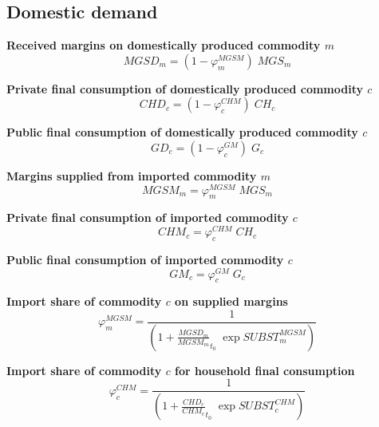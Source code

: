 \documentclass[12pt]{article}
\numberwithin{equation}{section}
\begin{document}
\subsection{Domestic demand}



\noindent \textbf{Received margins on domestically produced commodity $m$} 
\begin{dmath}
MGSD_{m} = \left( 1 - \varphi^{MGSM}_{m} \right) \; MGS_{m}
\label{Trade_inter.mdlMGSD[m]}
\end{dmath}

\noindent \textbf{Private final consumption of domestically produced commodity $c$} 
\begin{dmath}
CHD_{c} = \left( 1 - \varphi^{CHM}_{c} \right) \; CH_{c}
\label{Trade_inter.mdlCHD[c]}
\end{dmath}

\noindent \textbf{Public final consumption of domestically produced commodity $c$} 
\begin{dmath}
GD_{c} = \left( 1 - \varphi^{GM}_{c} \right) \; G_{c}
\label{Trade_inter.mdlGD[c]}
\end{dmath}

\noindent \textbf{Margins supplied from imported commodity $m$} 
\begin{dmath}
MGSM_{m} = \varphi^{MGSM}_{m} \; MGS_{m}
\label{Trade_inter.mdlMGSM[m]}
\end{dmath}

\noindent \textbf{Private final consumption of imported commodity $c$} 
\begin{dmath}
CHM_{c} = \varphi^{CHM}_{c} \; CH_{c}
\label{Trade_inter.mdlCHM[c]}
\end{dmath}

\noindent \textbf{Public final consumption of imported commodity $c$} 
\begin{dmath}
GM_{c} = \varphi^{GM}_{c} \; G_{c}
\label{Trade_inter.mdlGM[c]}
\end{dmath}

\noindent \textbf{Import share of commodity $c$ on supplied margins} 
\begin{dmath}
\varphi^{MGSM}_{m} = \frac{1}{\left( 1 + \frac{MGSD_{m}}{MGSM_{m}}_{t_0} \; \operatorname{exp} SUBST^{MGSM}_{m} \right)}
\label{Trade_inter.mdlphi_MGSM[m]}
\end{dmath}

\noindent \textbf{Import share of commodity $c$ for household final consumption} 
\begin{dmath}
\varphi^{CHM}_{c} = \frac{1}{\left( 1 + \frac{CHD_{c}}{CHM_{c}}_{t_0} \; \operatorname{exp} SUBST^{CHM}_{c} \right)}
\label{Trade_inter.mdlphi_CHM[c]}
\end{dmath}
\end{document}
